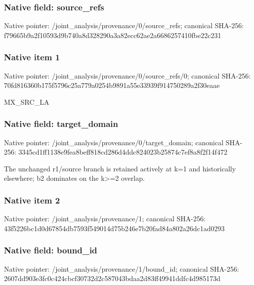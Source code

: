 \documentclass[10pt,a4paper]{article}
\begin{document}
\subsubsection{Native field: source\_\allowbreak{}refs}
Native pointer: /joint\_\allowbreak{}analysis/provenance/0/source\_\allowbreak{}refs; canonical SHA-256: f79665b9a2f10593d9b740a8d328290a3a82ecc62ae2a6686257410fbe22c231

\subsubsection{Native item 1}
Native pointer: /joint\_\allowbreak{}analysis/provenance/0/source\_\allowbreak{}refs/0; canonical SHA-256: 70fd816360b175f5796c25a779a0254b9891a55e33939f914750289a2f30eaae

\begingroup\raggedright\sloppy MX\_\allowbreak{}SRC\_\allowbreak{}LA\par\endgroup

\subsubsection{Native field: target\_\allowbreak{}domain}
Native pointer: /joint\_\allowbreak{}analysis/provenance/0/target\_\allowbreak{}domain; canonical SHA-256: 3345cd1ff1138e9fea8beff818cd286d4ddc824023b25874c7ef8a8f2f14f472

\begingroup\raggedright\sloppy The unchanged r1/\allowbreak{}source branch is retained actively at k=\allowbreak{}1 and historically elsewhere;\allowbreak{} b2 dominates on the k>=\allowbreak{}2 overlap.\par\endgroup

\subsubsection{Native item 2}
Native pointer: /joint\_\allowbreak{}analysis/provenance/1; canonical SHA-256: 43f5226bc1d0d67854db7593f549014d75b246e7b20fad84a802a26dc1ad0293

\subsubsection{Native field: bound\_\allowbreak{}id}
Native pointer: /joint\_\allowbreak{}analysis/provenance/1/bound\_\allowbreak{}id; canonical SHA-256: 2607dd903e3fc0c424cbcf30732d2c587043bdaa2d83ff49941ddfc4d985173d
\end{document}
